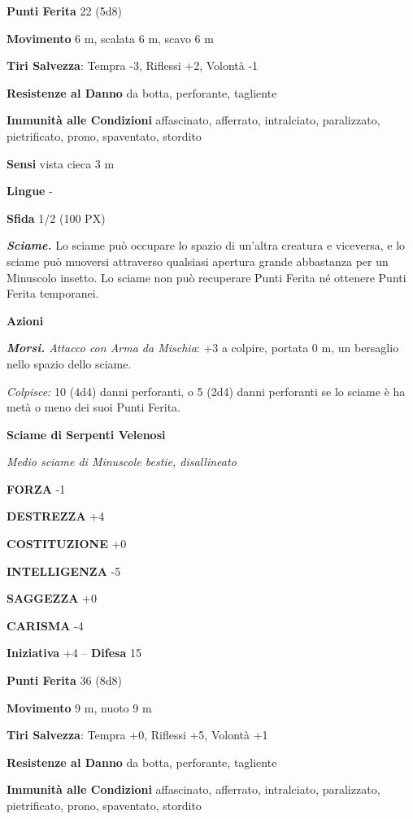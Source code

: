 \begin{multicols}{2}
	\textbf{Punti Ferita} 22 (5d8)

	\textbf{Movimento} 6 m, scalata 6 m, scavo 6 m

	\textbf{Tiri Salvezza}: Tempra -3, Riflessi +2, Volontà -1

	\textbf{Resistenze al Danno} da botta, perforante, tagliente

	\textbf{Immunità alle Condizioni} affascinato, afferrato, intralciato, paralizzato, pietrificato, prono, spaventato, stordito

	\textbf{Sensi} vista cieca 3 m

	\textbf{Lingue} -

	\textbf{Sfida} 1/2 (100 PX)

	\textit{\textbf{Sciame.}} Lo sciame può occupare lo spazio di un'altra creatura e viceversa, e lo sciame può muoversi attraverso qualsiasi apertura grande abbastanza per un Minuscolo insetto. Lo sciame non può recuperare Punti Ferita né ottenere Punti Ferita temporanei.

	\textbf{Azioni}

	\textit{\textbf{Morsi.} Attacco con Arma da Mischia}: +3 a colpire, portata 0 m, un bersaglio nello spazio dello sciame.

	\textit{Colpisce:} 10 (4d4) danni perforanti, o 5 (2d4) danni perforanti se lo sciame è ha metà o meno dei suoi Punti Ferita.

	\medskip\textbf{Sciame di Serpenti Velenosi}

	\textit{Medio sciame di Minuscole bestie, disallineato}

	\textbf{FORZA} -1

	\textbf{DESTREZZA} +4

	\textbf{COSTITUZIONE} +0

	\textbf{INTELLIGENZA} -5

	\textbf{SAGGEZZA} +0

	\textbf{CARISMA} -4

	\textbf{Iniziativa} +4 -- \textbf{Difesa} 15

	\textbf{Punti Ferita} 36 (8d8)

	\textbf{Movimento} 9 m, nuoto 9 m

	\textbf{Tiri Salvezza}: Tempra +0, Riflessi +5, Volontà +1

	\textbf{Resistenze al Danno} da botta, perforante, tagliente

	\textbf{Immunità alle Condizioni} affascinato, afferrato, intralciato, paralizzato, pietrificato, prono, spaventato, stordito


\end{multicols}
